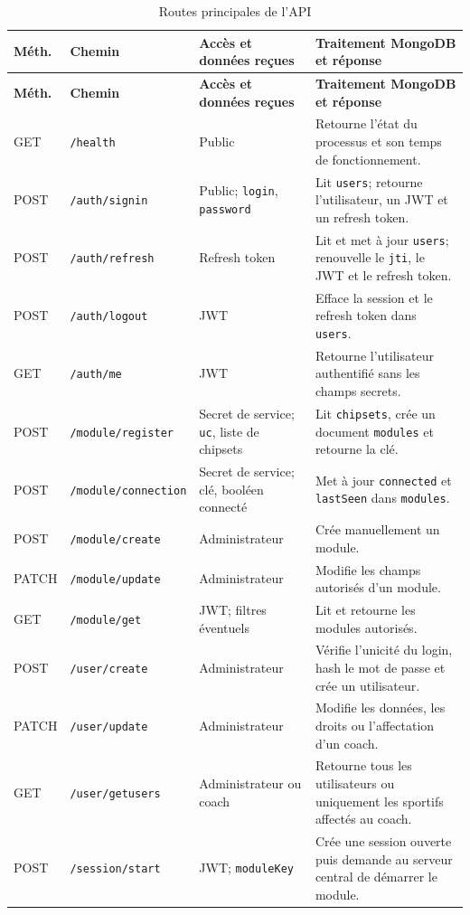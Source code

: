 \documentclass[11pt,a4paper]{article}
\newcommand{\code}[1]{\nolinkurl{#1}}
\begin{document}
\begin{longtable}{L{1.5cm}L{4.2cm}L{4.0cm}L{6.3cm}}
\caption{Routes principales de l'API}\label{tab:api-routes}\\
\toprule
\textbf{Méth.} & \textbf{Chemin} & \textbf{Accès et données reçues} & \textbf{Traitement MongoDB et réponse} \\
\midrule
\endfirsthead
\toprule
\textbf{Méth.} & \textbf{Chemin} & \textbf{Accès et données reçues} & \textbf{Traitement MongoDB et réponse} \\
\midrule
\endhead
GET & \code{/health} & Public & Retourne l'état du processus et son temps de fonctionnement. \\
POST & \code{/auth/signin} & Public; \code{login}, \code{password} & Lit \code{users}; retourne l'utilisateur, un JWT et un refresh token. \\
POST & \code{/auth/refresh} & Refresh token & Lit et met à jour \code{users}; renouvelle le \code{jti}, le JWT et le refresh token. \\
POST & \code{/auth/logout} & JWT & Efface la session et le refresh token dans \code{users}. \\
GET & \code{/auth/me} & JWT & Retourne l'utilisateur authentifié sans les champs secrets. \\
POST & \code{/module/register} & Secret de service; \code{uc}, liste de chipsets & Lit \code{chipsets}, crée un document \code{modules} et retourne la clé. \\
POST & \code{/module/connection} & Secret de service; clé, booléen connecté & Met à jour \code{connected} et \code{lastSeen} dans \code{modules}. \\
POST & \code{/module/create} & Administrateur & Crée manuellement un module. \\
PATCH & \code{/module/update} & Administrateur & Modifie les champs autorisés d'un module. \\
GET & \code{/module/get} & JWT; filtres éventuels & Lit et retourne les modules autorisés. \\
POST & \code{/user/create} & Administrateur & Vérifie l'unicité du login, hash le mot de passe et crée un utilisateur. \\
PATCH & \code{/user/update} & Administrateur & Modifie les données, les droits ou l'affectation d'un coach. \\
GET & \code{/user/getusers} & Administrateur ou coach & Retourne tous les utilisateurs ou uniquement les sportifs affectés au coach. \\
POST & \code{/session/start} & JWT; \code{moduleKey} & Crée une session ouverte puis demande au serveur central de démarrer le module. \\

\end{longtable}
\end{document}
